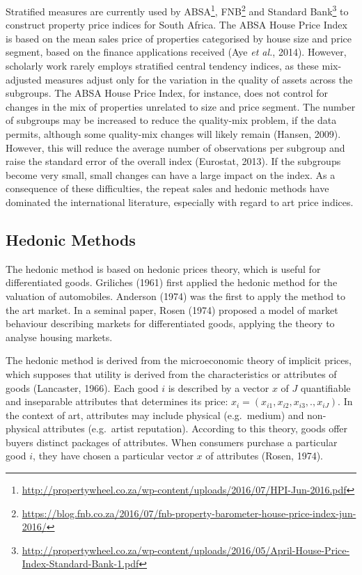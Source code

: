 \documentclass[12pt,]{article}
\let\rmarkdownfootnote\footnote%
\def\footnote{\protect\rmarkdownfootnote}
\begin{document}
Stratified measures are currently used by ABSA\footnote{\url{http://propertywheel.co.za/wp-content/uploads/2016/07/HPI-Jun-2016.pdf}},
FNB\footnote{\url{https://blog.fnb.co.za/2016/07/fnb-property-barometer-house-price-index-jun-2016/}}
and Standard Bank\footnote{\url{http://propertywheel.co.za/wp-content/uploads/2016/05/April-House-Price-Index-Standard-Bank-1.pdf}}
to construct property price indices for South Africa. The ABSA House
Price Index is based on the mean sales price of properties categorised
by house size and price segment, based on the finance applications
received (Aye \emph{et al.}, 2014). However, scholarly work rarely
employs stratified central tendency indices, as these mix-adjusted
measures adjust only for the variation in the quality of assets across
the subgroups. The ABSA House Price Index, for instance, does not
control for changes in the mix of properties unrelated to size and price
segment. The number of subgroups may be increased to reduce the
quality-mix problem, if the data permits, although some quality-mix
changes will likely remain (Hansen, 2009). However, this will reduce the
average number of observations per subgroup and raise the standard error
of the overall index (Eurostat, 2013). If the subgroups become very
small, small changes can have a large impact on the index. As a
consequence of these difficulties, the repeat sales and hedonic methods
have dominated the international literature, especially with regard to
art price indices.

\subsection{Hedonic Methods}\label{hedonic-methods}

The hedonic method is based on hedonic prices theory, which is useful
for differentiated goods. Griliches (1961) first applied the hedonic
method for the valuation of automobiles. Anderson (1974) was the first
to apply the method to the art market. In a seminal paper, Rosen (1974)
proposed a model of market behaviour describing markets for
differentiated goods, applying the theory to analyse housing markets.

The hedonic method is derived from the microeconomic theory of implicit
prices, which supposes that utility is derived from the characteristics
or attributes of goods (Lancaster, 1966). Each good \(i\) is described
by a vector \(x\) of \(J\) quantifiable and inseparable attributes that
determines its price: \(x_i = (x_{i1}, x_{i2}, x_{i3}, ., x_{iJ})\). In
the context of art, attributes may include physical (e.g.~medium) and
non-physical attributes (e.g.~artist reputation). According to this
theory, goods offer buyers distinct packages of attributes. When
consumers purchase a particular good \(i\), they have chosen a
particular vector \(x\) of attributes (Rosen, 1974).
\end{document}
